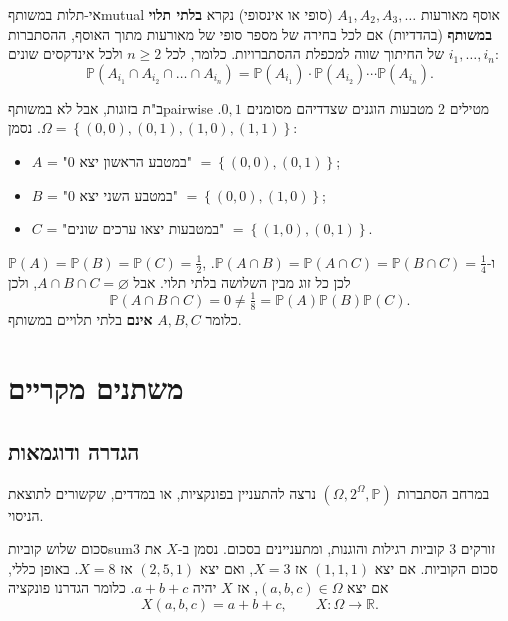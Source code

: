 \documentclass[11pt,a4paper]{report}
\newcommand{\R}{\mathbb{R}}
\newcommand{\set}[1]{\left\{#1\right\}}
\renewcommand{\emptyset}{\varnothing}
\newcommand{\PP}{\mathbb{P}}
\begin{document}
\begin{definition}{אי-תלות במשותף}{mutual}
אוסף מאורעות $A_1,A_2,A_3,\dots$ (סופי או אינסופי) נקרא \textbf{בלתי תלוי במשותף} (בהדדיות) אם לכל בחירה של מספר סופי של מאורעות מתוך האוסף, ההסתברות של החיתוך שווה למכפלת ההסתברויות. כלומר, לכל $n\ge2$ ולכל אינדקסים שונים $i_1,\dots,i_n$:
\[
  \PP(A_{i_1}\cap A_{i_2}\cap\dots\cap A_{i_n})=\PP(A_{i_1})\cdot\PP(A_{i_2})\cdots\PP(A_{i_n}).
\]
\end{definition}

\begin{example}{ב"ת בזוגות, אבל לא במשותף}{pairwise}
מטילים 2 מטבעות הוגנים שצדדיהם מסומנים $0,1$. $\Omega=\set{(0,0),(0,1),(1,0),(1,1)}$. נסמן:
\begin{itemize}
  \item $A$ = "במטבע הראשון יצא 0" $=\set{(0,0),(0,1)}$;
  \item $B$ = "במטבע השני יצא 0" $=\set{(0,0),(1,0)}$;
  \item $C$ = "במטבעות יצאו ערכים שונים" $=\set{(1,0),(0,1)}$.
\end{itemize}
$\PP(A)=\PP(B)=\PP(C)=\frac12$, ו-$\PP(A\cap B)=\PP(A\cap C)=\PP(B\cap C)=\frac14$. לכן כל זוג מבין השלושה בלתי תלוי.
אבל $A\cap B\cap C=\emptyset$, ולכן
\[
  \PP(A\cap B\cap C)=0\neq\tfrac18=\PP(A)\PP(B)\PP(C).
\]
כלומר $A,B,C$ \textbf{אינם} בלתי תלויים במשותף.
\end{example}

\chapter{משתנים מקריים}

\section{הגדרה ודוגמאות}

במרחב הסתברות $(\Omega,2^\Omega,\PP)$ נרצה להתעניין בפונקציות, או במדדים, שקשורים לתוצאת הניסוי.

\begin{example}{סכום שלוש קוביות}{sum3}
זורקים 3 קוביות רגילות והוגנות, ומתעניינים בסכום. נסמן ב-$X$ את סכום הקוביות. אם יצא $(1,1,1)$ אז $X=3$, ואם יצא $(2,5,1)$ אז $X=8$.
באופן כללי, אם יצא $(a,b,c)\in\Omega$, אז $X$ יהיה $a+b+c$. כלומר הגדרנו פונקציה
\[
  X(a,b,c)=a+b+c,\qquad X:\Omega\to\R.
\]
\end{example}
\end{document}
